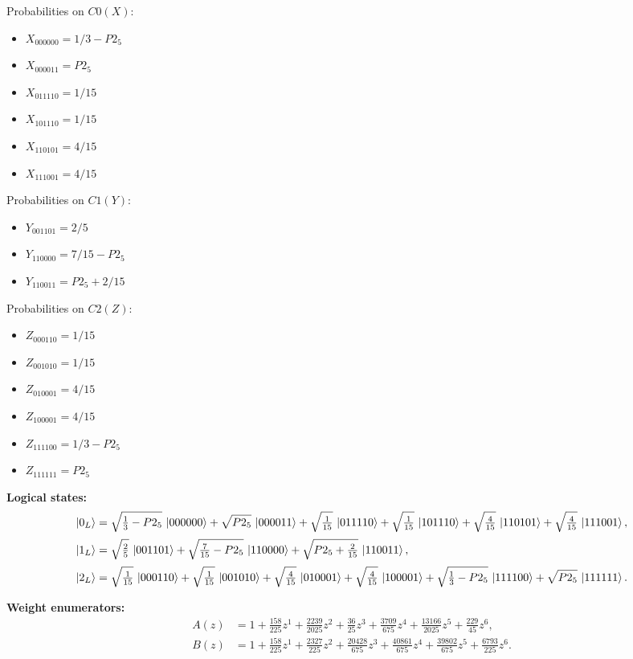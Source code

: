 \documentclass[11pt]{article}
\begin{document}
Probabilities on $C0 (X)$:
\begin{itemize}
    \item $X_{000000} = 1/3 - P2_5$
    \item $X_{000011} = P2_5$
    \item $X_{011110} = 1/15$
    \item $X_{101110} = 1/15$
    \item $X_{110101} = 4/15$
    \item $X_{111001} = 4/15$
\end{itemize}

Probabilities on $C1 (Y)$:
\begin{itemize}
    \item $Y_{001101} = 2/5$
    \item $Y_{110000} = 7/15 - P2_5$
    \item $Y_{110011} = P2_5 + 2/15$
\end{itemize}

Probabilities on $C2 (Z)$:
\begin{itemize}
    \item $Z_{000110} = 1/15$
    \item $Z_{001010} = 1/15$
    \item $Z_{010001} = 4/15$
    \item $Z_{100001} = 4/15$
    \item $Z_{111100} = 1/3 - P2_5$
    \item $Z_{111111} = P2_5$
\end{itemize}

\noindent\textbf{Logical states:}
\begin{align*}
\ket{0_L} &= \sqrt{\tfrac{1}{3} - P2_5}\,\ket{000000} + \sqrt{P2_5}\,\ket{000011} + \sqrt{\tfrac{1}{15}}\,\ket{011110} + \sqrt{\tfrac{1}{15}}\,\ket{101110} + \sqrt{\tfrac{4}{15}}\,\ket{110101} + \sqrt{\tfrac{4}{15}}\,\ket{111001},
\\[2pt]
\ket{1_L} &= \sqrt{\tfrac{2}{5}}\,\ket{001101} + \sqrt{\tfrac{7}{15} - P2_5}\,\ket{110000} + \sqrt{P2_5 + \tfrac{2}{15}}\,\ket{110011},
\\[2pt]
\ket{2_L} &= \sqrt{\tfrac{1}{15}}\,\ket{000110} + \sqrt{\tfrac{1}{15}}\,\ket{001010} + \sqrt{\tfrac{4}{15}}\,\ket{010001} + \sqrt{\tfrac{4}{15}}\,\ket{100001} + \sqrt{\tfrac{1}{3} - P2_5}\,\ket{111100} + \sqrt{P2_5}\,\ket{111111}.
\end{align*}

\noindent\textbf{Weight enumerators:}
\begin{align*}
A(z) &= 1 + \tfrac{158}{225}z^{1} + \tfrac{2239}{2025}z^{2} + \tfrac{36}{25}z^{3} + \tfrac{3709}{675}z^{4} + \tfrac{13166}{2025}z^{5} + \tfrac{229}{45}z^{6},\\[2pt]
B(z) &= 1 + \tfrac{158}{225}z^{1} + \tfrac{2327}{225}z^{2} + \tfrac{20428}{675}z^{3} + \tfrac{40861}{675}z^{4} + \tfrac{39802}{675}z^{5} + \tfrac{6793}{225}z^{6}.
\end{align*}
\end{document}
